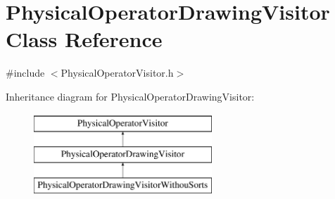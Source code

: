 \hypertarget{class_physical_operator_drawing_visitor}{\section{Physical\+Operator\+Drawing\+Visitor Class Reference}
\label{class_physical_operator_drawing_visitor}
}


{\ttfamily \#include $<$Physical\+Operator\+Visitor.\+h$>$}

Inheritance diagram for Physical\+Operator\+Drawing\+Visitor\+:\begin{figure}[H]
\begin{center}
\leavevmode
\includegraphics[height=3.000000cm]{class_physical_operator_drawing_visitor}
\end{center}
\end{figure}
